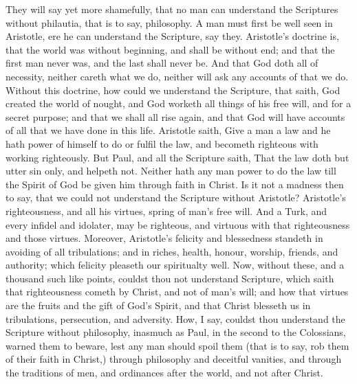 They will say yet more shamefully, that no 
man can understand the Scriptures without philautia,
that is to say, philosophy. A man must 
first be well seen in Aristotle, ere he can understand
the Scripture, say they. Aristotle's doctrine
is, that the world was without beginning, 
and shall be without end; and that the first man 
never was, and the last shall never be. And 
that God doth all of necessity, neither careth 
what we do, neither will ask any accounts of 
that we do. Without this doctrine, how could 
we understand the Scripture, that saith, God 
created the world of nought, and God worketh 
all things of his free will, and for a secret purpose;
and that we shall all rise again, and that 
God will have accounts of all that we have done 
in this life. Aristotle saith, Give a man a law
and he hath power of himself to do or fulfil the 
law, and becometh righteous with working 
righteously. But Paul, and all the Scripture
saith, That the law doth but utter sin only, 
and helpeth not. Neither hath any man power 
to do the law till the Spirit of God be given him 
through faith in Christ. Is it not a madness then 
to say, that we could not understand the Scripture
without Aristotle? Aristotle's righteousness,
and all his virtues, spring of man's free 
will. And a Turk, and every infidel and idolater,
may be righteous, and virtuous with that 
righteousness and those virtues. Moreover, 
Aristotle's felicity and blessedness standeth in 
avoiding of all tribulations; and in riches, health, 
honour, worship, friends, and authority; which 
felicity pleaseth our spiritualty well. Now, 
without these, and a thousand such like points, 
couldst thou not understand Scripture, which
saith that righteousness cometh by Christ, and 
not of man's will; and how that virtues are the 
fruits and the gift of God's Spirit, and that Christ 
blesseth us in tribulations, persecution, and adversity.
How, I say, couldst thou understand 
the Scripture without philosophy, inasmuch as 
Paul, in the second to the Colossians, warned 
them to beware, lest any man should spoil them 
(that is to say, rob them of their faith in Christ,) 
through philosophy and deceitful vanities, and 
through the traditions of men, and ordinances 
after the world, and not after Christ. 

